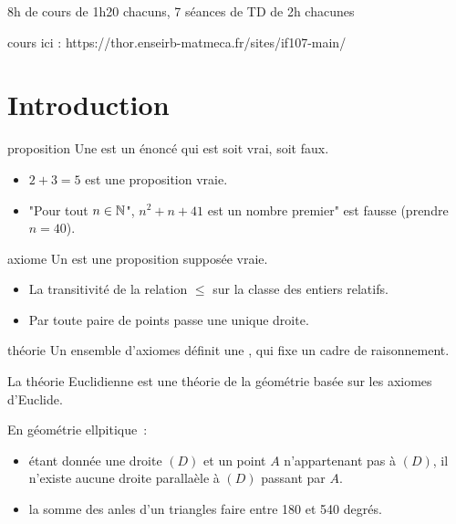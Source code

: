 8h de cours de 1h20 chacuns, 7 séances de TD de 2h chacunes

cours ici : https://thor.enseirb-matmeca.fr/sites/if107-main/

\section{Introduction} 

\begin{definition}{}{proposition}
    Une  est un énoncé qui est soit vrai, soit faux.
\end{definition}

\begin{exemple}{}{}
    \begin{itemize}
        \item $2+3 = 5$ est une proposition vraie.
        \item "Pour tout $n \in \mathbb{N}$", $n^2 + n + 41$ est un nombre premier" est fausse (prendre $n=40$).
    \end{itemize}
\end{exemple}

\begin{definition}{}{axiome}
    Un  est une proposition supposée vraie.
\end{definition}

\begin{exemple}{}{}
    \begin{itemize}
        \item La transitivité de la relation $\leq$ sur la classe des entiers relatifs.
        \item Par toute paire de points passe une unique droite.
    \end{itemize}
\end{exemple}

\begin{definition}{}{théorie}
    Un ensemble d'axiomes définit une , qui fixe un cadre de raisonnement.
\end{definition}

\begin{exemple}{}{}
    La théorie Euclidienne est une théorie de la géométrie basée sur les axiomes d'Euclide.
\end{exemple}

\begin{exemple}{}{}
    En géométrie ellpitique~:
    \begin{itemize}
        \item étant donnée une droite $(D)$ et un point $A$ n'appartenant pas à $(D)$, il n'existe aucune droite parallaèle à $(D)$ passant par $A$.
        \item la somme des anles d'un triangles faire entre 180 et 540 degrés.
    \end{itemize}
\end{exemple}

